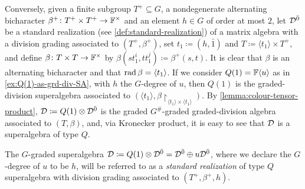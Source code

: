 Conversely, given a finite subgroup $T^+ \subseteq G$, a nondegenerate alternating bicharacter $\beta^+\colon T^+ \times T^+ \to \mathbb{F}^\times$ and an element $h\in G$ of order at most $2$, let $\mathcal{D}^{\bar0}$ be a standard realization (see \cref{def:standard-realization}) of a matrix algebra with a division grading associated to $(T^+, \beta^+)$, set $t_1 \coloneqq (h, \bar 1)$ and $T \coloneqq \langle t_1 \rangle \times T^+$, and define $\beta\colon T \times T \to \mathbb{F}^\times$ by $\beta(s t_1^i, t t_1^j) \coloneqq \beta^+(s,t)$. 
It is clear that $\beta$ is an alternating bicharacter and that $\operatorname{rad} \beta = \langle t_1 \rangle$. 
If we consider $Q(1) = \mathbb{F} \langle u \rangle$ as in \cref{ex:Q(1)-as-grd-div-SA}, with $h$ the $G$-degree of $u$, then $Q(1)$ is the graded-division superalgebra associated to $(\langle t_1 \rangle, \beta\restriction_{ \langle t_1 \rangle \times \langle t_1 \rangle })$. 
By \cref{lemma:colour-tensor-product}, $\mathcal{D} \coloneqq Q(1)\otimes \mathcal{D}^{\bar0}$ is the graded $G^\#$-graded graded-division algebra associated to $(T, \beta)$, and, via Kronecker product, it is easy to see that $\mathcal{D}$ is a superalgebra of type $Q$. 

\begin{defi}\label{def:standard-realization-Q}
    The $G$-graded superalgebra $\mathcal{D} \coloneqq Q(1) \otimes \mathcal{D}^{\bar0} = \mathcal{D}^{\bar0} \oplus u\mathcal{D}^{\bar0}$, where we declare the $G$-degree of $u$ to be $h$, will be referred to as a \emph{standard realization} of type $Q$ superalgebra with division grading associated to $(T^+, \beta^+, h)$.
\end{defi}


    
